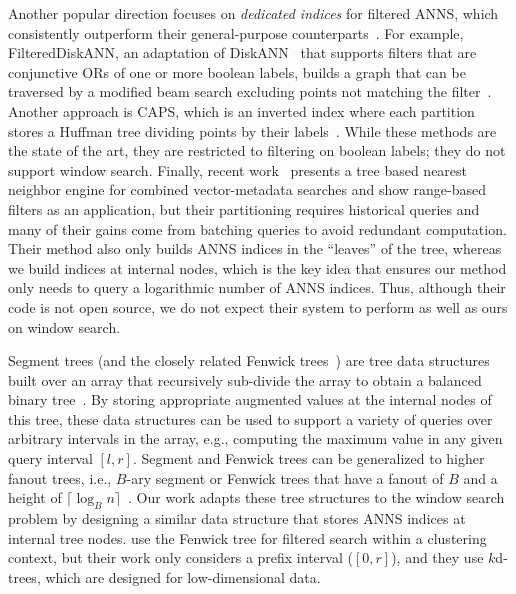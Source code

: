 \documentclass{article}
\newcommand{\myparagraph}[1]{\smallskip\noindent {\bf #1.}}
\theoremstyle{plain}
\theoremstyle{definition}
\theoremstyle{remark}
\begin{document}
Another popular direction focuses on \textit{dedicated indices} for filtered ANNS, which consistently outperform their general-purpose counterparts~\cite{neurips23bigann}. For example, FilteredDiskANN, an adaptation of DiskANN~\cite{diskann} that supports filters that are conjunctive ORs of one or more boolean labels, builds a graph that can be traversed by a modified beam search excluding points not matching the filter~\cite{filtereddiskANN}. Another approach is CAPS, which is an inverted index where each partition stores a Huffman tree dividing points by their labels~\cite{gupta2023caps}. While these methods are the state of the art, they are restricted to filtering on boolean labels; they do not support window search. Finally, recent work~\cite{mohoney2023high} presents a tree based nearest neighbor engine for combined vector-metadata searches and show range-based filters as an application, but their partitioning requires historical queries and many of their gains come from batching queries to avoid redundant computation. Their method also only builds ANNS indices in the “leaves” of the tree, whereas we build indices at internal nodes, which is the key idea that ensures our method only needs to query a logarithmic number of ANNS indices. Thus, although their code is not open source, we do not expect their system to perform as well as ours on window search.


\myparagraph{Segment Trees}
Segment trees (and the closely related Fenwick
trees~\cite{fenwick1994new}) are tree data structures built over an
array that recursively sub-divide the array to obtain a balanced
binary tree~\cite{bentley1977algorithms}. By storing appropriate augmented values
at the internal nodes of this tree, these data structures can be
used to support a variety of queries over arbitrary intervals
in the array, e.g., computing the maximum value in any given query interval
$[l, r]$.
%
Segment and Fenwick trees can be generalized to higher
fanout trees, i.e., $B$-ary segment or Fenwick trees that have a
fanout of $B$ and a height of $\lceil \log_{B} n \rceil$~\cite{pibiri2021practical}.
Our work adapts these tree structures to the window search problem by designing a similar data structure that stores ANNS indices at internal tree nodes.
\citet{huang2023faster} use the Fenwick tree for filtered search within a clustering context, but their work only considers a prefix interval ($[0, r]$), and they use $k$d-trees, which are designed for low-dimensional data.
\end{document}
